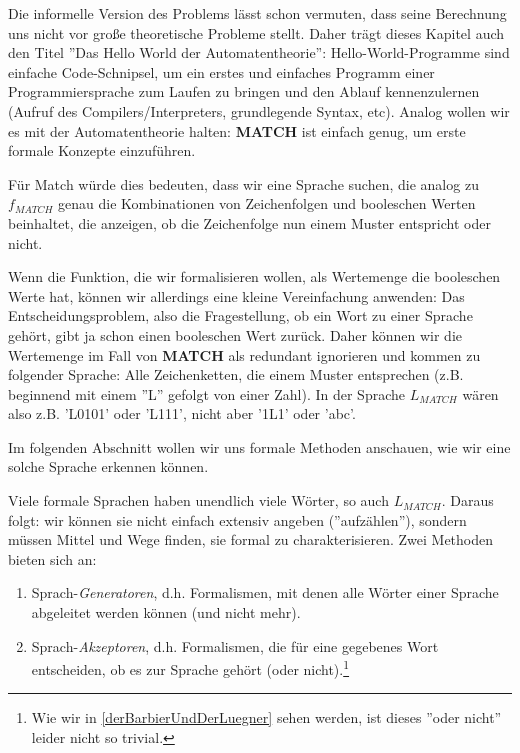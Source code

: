Die informelle Version des Problems lässt schon vermuten,
dass seine Berechnung uns nicht vor große theoretische Probleme stellt.
Daher trägt dieses Kapitel auch den Titel ''Das Hello World der Automatentheorie'':
Hello-World-Programme sind einfache Code-Schnipsel,
um ein erstes und einfaches Programm einer Programmiersprache zum Laufen zu bringen
und den Ablauf kennenzulernen (Aufruf des Compilers/Interpreters, grundlegende Syntax, etc).
Analog wollen wir es mit der Automatentheorie halten:
\textbf{MATCH} ist einfach genug, um erste formale Konzepte einzuführen.



Für Match würde dies bedeuten, dass wir eine Sprache suchen,
die analog zu $f_{MATCH}$ genau die Kombinationen von Zeichenfolgen und booleschen Werten beinhaltet,
die anzeigen, ob die Zeichenfolge nun einem Muster entspricht oder nicht.

Wenn die Funktion, die wir formalisieren wollen, als Wertemenge die booleschen Werte hat,
können wir allerdings eine kleine Vereinfachung anwenden:
Das Entscheidungsproblem, also die Fragestellung, ob ein Wort zu einer Sprache gehört,
gibt ja schon einen booleschen Wert zurück.
Daher können wir die Wertemenge im Fall von \textbf{MATCH} als redundant ignorieren
und kommen zu folgender Sprache:
Alle Zeichenketten, die einem Muster entsprechen
(z.B. beginnend mit einem ''L'' gefolgt von einer Zahl).
In der Sprache $L_{MATCH}$ wären also z.B. 'L0101' oder 'L111',
nicht aber '1L1' oder 'abc'.

Im folgenden Abschnitt wollen wir uns formale Methoden anschauen,
wie wir eine solche Sprache erkennen können.


Viele formale Sprachen haben unendlich viele Wörter,
so auch $L_{MATCH}$.
Daraus folgt: wir können sie nicht einfach extensiv angeben (''aufzählen''),
sondern müssen Mittel und Wege finden, sie formal zu charakterisieren.
Zwei Methoden bieten sich an:
\begin{enumerate}
    \item Sprach-\emph{Generatoren}, d.h. Formalismen,
        mit denen alle Wörter einer Sprache abgeleitet werden können
        (und nicht mehr).
    \item Sprach-\emph{Akzeptoren}, d.h. Formalismen,
        die für eine gegebenes Wort entscheiden,
        ob es zur Sprache gehört (oder nicht).\footnote{
            Wie wir in \autoref{derBarbierUndDerLuegner} sehen werden,
            ist dieses ''oder nicht'' leider nicht so trivial.}
\end{enumerate}

